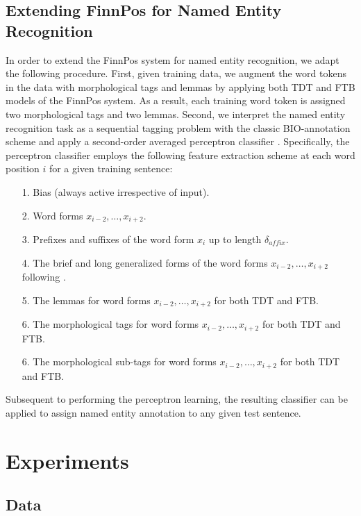\documentclass[11pt]{article}
\begin{document}
\subsection{Extending FinnPos for Named Entity Recognition}

In order to extend the FinnPos system for named entity recognition, we adapt the following procedure. First, given training data, we augment the word tokens in the data with morphological tags and lemmas by applying both TDT and FTB models of the FinnPos system. As a result, each training word token is assigned two morphological tags and two lemmas. Second, we interpret the named entity recognition task as a sequential tagging problem with the classic BIO-annotation scheme and apply a second-order averaged perceptron classifier \citep{collins2003}. Specifically, the perceptron classifier employs the following feature extraction scheme at each word position $i$ for a given training sentence:

\begin{itemize}
\item[1.] Bias (always active irrespective of input).
\item[2.] Word forms $x_{i-2}, \dots, x_{i+2}$.
\item[3.] Prefixes and suffixes of the word form $x_i$ up to length $\delta_{affix}$.
\item[4.] The brief and long generalized forms of the word forms $x_{i-2}, \dots, x_{i+2}$ following \citet{collins2002}.
\item[5.] The lemmas for word forms $x_{i-2}, \dots, x_{i+2}$ for both TDT and FTB. 
\item[6.] The morphological tags for word forms $x_{i-2}, \dots, x_{i+2}$ for both TDT and FTB. 
\item[6.] The morphological sub-tags for word forms $x_{i-2}, \dots, x_{i+2}$ for both TDT and FTB. 
\end{itemize}

Subsequent to performing the perceptron learning, the resulting classifier can be applied to assign named entity annotation to any given test sentence.


\section{Experiments}
\label{sec: experiments}

\subsection{Data}
\label{sec: data}
\end{document}
